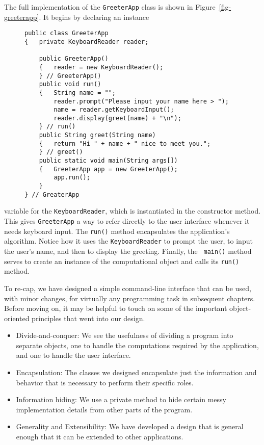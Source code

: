 The full implementation of the {\tt GreeterApp} class is shown in
Figure~\ref{fig-greeterapp}.  It begins by declaring an instance
\begin{figure}[h!]
\jjjprogstart
\begin{jjjlisting}
\begin{lstlisting}
public class GreeterApp 
{   private KeyboardReader reader;

    public GreeterApp() 
    {   reader = new KeyboardReader();
    } // GreeterApp()
    public void run() 
    {   String name = "";
        reader.prompt("Please input your name here > ");
        name = reader.getKeyboardInput();
        reader.display(greet(name) + "\n");
    } // run()
    public String greet(String name) 
    {   return "Hi " + name + " nice to meet you.";
    } // greet()
    public static void main(String args[]) 
    {   GreeterApp app = new GreeterApp();
        app.run();
    }
} // GreaterApp
\end{lstlisting}
\end{jjjlisting}
\end{figure}
variable for the {\tt KeyboardReader}, which is instantiated in the
constructor method. This gives {\tt GreeterApp} a way to refer
directly to the user interface whenever it needs keyboard input.  The
{\tt run()} method encapsulates the application's algorithm. Notice
how it uses the {\tt KeyboardReader} to prompt the user, to input the
user's name, and then to display the greeting.  Finally, the {\tt
main()} method serves to create an instance of the computational
object and calls its {\tt run()} method.


To re-cap, we have designed a simple command-line interface that can be
used, with minor changes, for virtually any programming task in
subsequent chapters.  Before moving on, it may be helpful to touch on
some of the important object-oriented principles that went into our
design.

\begin{itemize}
\item Divide-and-conquer: We see the usefulness of dividing a program
into separate objects, one to handle the computations required by the
application, and one to handle the user interface.

\item Encapsulation: The classes we designed encapsulate just the
information and behavior that is necessary to perform their specific
roles.

\item Information hiding: We use a private method to hide certain
messy implementation details from other parts of the program. 

\item Generality and Extensibility: We have developed a design that
is general enough that it can be extended to other applications. 
\end{itemize}

